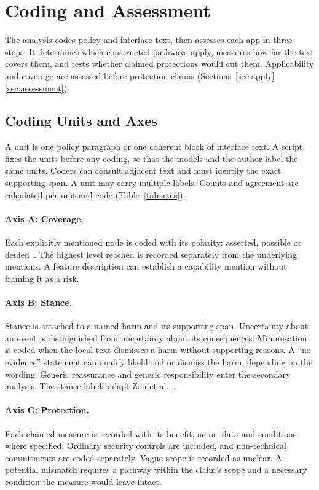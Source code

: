 \section{Coding and Assessment}
\label{sec:analysis}
The analysis codes policy and interface text, then assesses each app in three steps. It
determines which constructed pathways apply, measures how far the text covers them, and tests
whether claimed protections would cut them. Applicability and coverage are assessed before
protection claims (Sections~\ref{sec:apply}--\ref{sec:assessment}).

\subsection{Coding Units and Axes}
\label{sec:axes}
A unit is one policy paragraph or one coherent block of interface text. A script fixes the units
before any coding, so that the models and the author label the same units. Coders can
consult adjacent text and must identify the exact supporting span. A unit may carry multiple
labels. Counts and agreement are calculated per unit and code (Table~\ref{tab:axes}).

\paragraph{Axis A: Coverage.} Each explicitly mentioned node is coded with its polarity:
asserted, possible or denied~\parencite[\S1]{andow2019policylint}. The highest level reached is
recorded separately from the underlying mentions. A feature description can establish a
capability mention without framing it as a risk.

\paragraph{Axis B: Stance.} Stance is attached to a named harm and its supporting span.
Uncertainty about an event is distinguished from uncertainty about its consequences.
Minimisation is coded when the local text dismisses a harm without supporting reasons. A
\enquote{no evidence} statement can qualify likelihood or dismiss the harm, depending on the
wording. Generic reassurance and generic responsibility enter the secondary analysis. The stance
labels adapt Zou et al.~\parencite[pp.~7, 10]{zou2019might}.

\paragraph{Axis C: Protection.} Each claimed measure is recorded with its benefit, actor, data
and conditions where specified. Ordinary security controls are included, and non-technical
commitments are coded separately. Vague scope is recorded as unclear. A potential mismatch
requires a pathway within the claim's scope and a necessary condition the measure would leave
intact.

